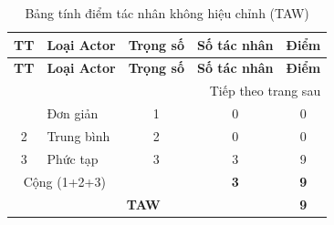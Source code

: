 \begin{longtable}{|c|p{4cm}|c|c|c|}
\caption{Bảng tính điểm tác nhân không hiệu chỉnh (TAW) \label{tab:taw}} \\
\hline
\textbf{TT} & \textbf{Loại Actor} & \textbf{Trọng số} & \textbf{Số tác nhân} & \textbf{Điểm} \\ \hline
\endfirsthead
\hline
\textbf{TT} & \textbf{Loại Actor} & \textbf{Trọng số} & \textbf{Số tác nhân} & \textbf{Điểm} \\ \hline
\endhead
\hline
\multicolumn{5}{r}{{Tiếp theo trang sau}} \\
\endfoot
\hline
\endlastfoot
1 & Đơn giản & 1 & 0 & 0 \\ \hline
2 & Trung bình & 2 & 0 & 0 \\ \hline
3 & Phức tạp & 3 & 3 & 9 \\ \hline
\multicolumn{2}{|c|}{Cộng (1+2+3)} & & \textbf{3} & \textbf{9} \\ \hline
\multicolumn{4}{|c|}{\textbf{TAW}} & \textbf{9} \\ \hline
\end{longtable}